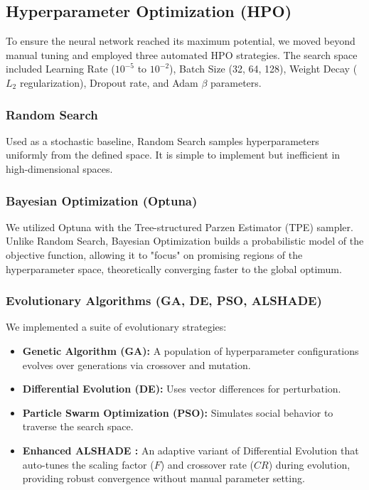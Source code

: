\documentclass[conference]{IEEEtran}
\begin{document}
\subsection{Hyperparameter Optimization (HPO)}
 To ensure the neural network reached its maximum potential, we moved beyond manual tuning and employed three automated HPO strategies. The search space included Learning Rate ($10^{-5}$ to $10^{-2}$), Batch Size (32, 64, 128), Weight Decay ($L_2$ regularization), Dropout rate, and Adam $\beta$ parameters.

\subsubsection{Random Search}
 Used as a stochastic baseline, Random Search samples hyperparameters uniformly from the defined space. It is simple to implement but inefficient in high-dimensional spaces.

\subsubsection{Bayesian Optimization (Optuna)}
 We utilized Optuna with the Tree-structured Parzen Estimator (TPE) sampler. Unlike Random Search, Bayesian Optimization builds a probabilistic model of the objective function, allowing it to "focus" on promising regions of the hyperparameter space, theoretically converging faster to the global optimum.

\subsubsection{Evolutionary Algorithms (GA, DE, PSO, ALSHADE)}
 We implemented a suite of evolutionary strategies:
\begin{itemize}
    \item \textbf{Genetic Algorithm (GA):} A population of hyperparameter configurations evolves over generations via crossover and mutation.
    \item \textbf{Differential Evolution (DE):} Uses vector differences for perturbation.
    \item \textbf{Particle Swarm Optimization (PSO):} Simulates social behavior to traverse the search space.
    \item \textbf{Enhanced ALSHADE \cite{karpinski2025deullm}:} An adaptive variant of Differential Evolution that auto-tunes the scaling factor ($F$) and crossover rate ($CR$) during evolution, providing robust convergence without manual parameter setting.
\end{itemize}
\end{document}
